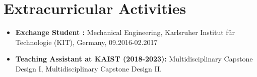 \documentclass[a4paper,11pt]{article}
\newcommand{\resumeItemListStart}{\begin{justify}\begin{itemize}[leftmargin=3ex, rightmargin=2ex, noitemsep,labelsep=1.2mm,itemsep=0mm]\small}
\newcommand{\resumeItemListEnd}{\end{itemize}\end{justify}\vspace{-2mm}}
\begin{document}
\vspace{-1mm}
\section{\textbf{Extracurricular Activities}}
    \resumeItemListStart
        \item { \textbf{Exchange Student :}} {Mechanical Engineering,  Karlsruher Institut für Technologie (KIT), Germany, 09.2016-02.2017} \\
        \item { \textbf{Teaching Assistant at KAIST (2018-2023):}} {Multidisciplinary Capstone Design I,  Multidisciplinary Capstone Design II.} \\
    \resumeItemListEnd
\vspace{-4mm}

\vfill
{}
\end{document}
